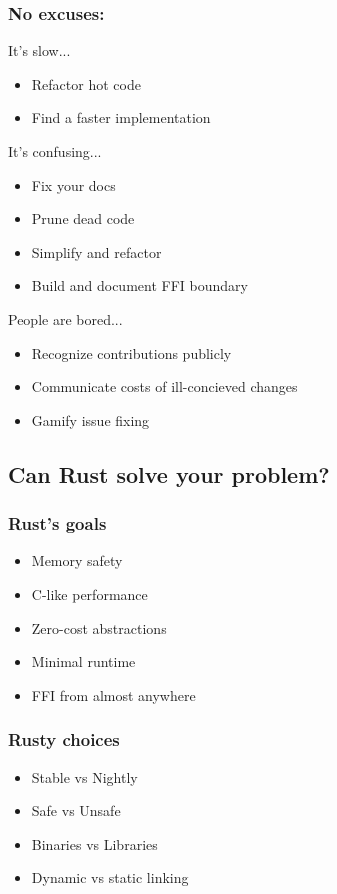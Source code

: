 \documentclass{beamer}
\begin{document}
\begin{frame}[fragile]
\frametitle{No excuses:}
It's slow...
\begin{itemize}[<+(1)->]
\item Refactor hot code
\item Find a faster implementation
\end{itemize}
It's confusing...
\begin{itemize}[<+(1)->]
\item Fix your docs
\item Prune dead code
\item Simplify and refactor
\item Build and document FFI boundary
\end{itemize}
People are bored...
\begin{itemize}[<+(1)->]
\item Recognize contributions publicly
\item Communicate costs of ill-concieved changes
\item Gamify issue fixing
\end{itemize}
\end{frame}

\subsection{Can Rust solve your problem?}

\begin{frame}[fragile]
\tableofcontents[currentsubsection]
\end{frame}


\begin{frame}[fragile]
\frametitle{Rust's goals}
\begin{itemize}[<+(1)->]
\item Memory safety
\item C-like performance
\item Zero-cost abstractions
\item Minimal runtime
\item FFI from almost anywhere
\end{itemize}
\end{frame}

\begin{frame}[fragile]
\frametitle{Rusty choices}
\begin{itemize}[<+(1)->]
\item Stable vs Nightly
\item Safe vs Unsafe
\item Binaries vs Libraries
\item Dynamic vs static linking
\end{itemize}
\end{frame}
\end{document}
